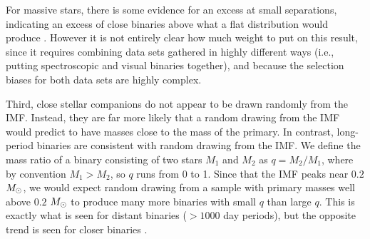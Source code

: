 For massive stars, there is some evidence for an excess at small separations, indicating an excess of close binaries above what a flat distribution would produce \citep{sana11a}. However it is not entirely clear how much weight to put on this result, since it requires combining data sets gathered in highly different ways (i.e., putting spectroscopic and visual binaries together), and because the selection biases for both data sets are highly complex.

Third, close stellar companions do not appear to be drawn randomly from the IMF. Instead, they are far more likely that a random drawing from the IMF would predict to have masses close to the mass of the primary. In contrast, long-period binaries are consistent with random drawing from the IMF.  We define the mass ratio of a binary consisting of two stars $M_1$ and $M_2$ as $q=M_2/M_1$, where by convention $M_1 > M_2$, so $q$ runs from 0 to 1. Since that the IMF peaks near $0.2$ $M_{\odot}$, we would expect random drawing from a sample with primary masses well above $0.2$ $M_{\odot}$ to produce many more binaries with small $q$ than large $q$. This is exactly what is seen for distant binaries ($>1000$ day periods), but the opposite trend is seen for closer binaries \citep{mazeh92a, sana11a}.

